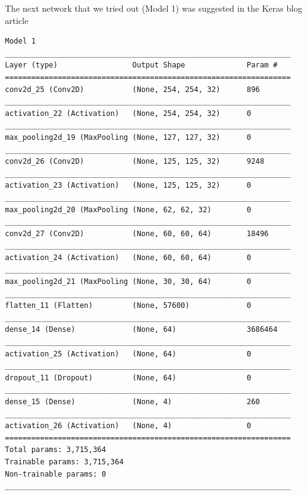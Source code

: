 \documentclass[10pt,a4paper]{article}
\begin{document}
\newpage
The next network that we tried out (Model 1) was suggested in the Keras blog article \cite{Chollet_2016}
\begin{lstlisting}
Model 1
_________________________________________________________________
Layer (type)                 Output Shape              Param #   
=================================================================
conv2d_25 (Conv2D)           (None, 254, 254, 32)      896       
_________________________________________________________________
activation_22 (Activation)   (None, 254, 254, 32)      0         
_________________________________________________________________
max_pooling2d_19 (MaxPooling (None, 127, 127, 32)      0         
_________________________________________________________________
conv2d_26 (Conv2D)           (None, 125, 125, 32)      9248      
_________________________________________________________________
activation_23 (Activation)   (None, 125, 125, 32)      0         
_________________________________________________________________
max_pooling2d_20 (MaxPooling (None, 62, 62, 32)        0         
_________________________________________________________________
conv2d_27 (Conv2D)           (None, 60, 60, 64)        18496     
_________________________________________________________________
activation_24 (Activation)   (None, 60, 60, 64)        0         
_________________________________________________________________
max_pooling2d_21 (MaxPooling (None, 30, 30, 64)        0         
_________________________________________________________________
flatten_11 (Flatten)         (None, 57600)             0         
_________________________________________________________________
dense_14 (Dense)             (None, 64)                3686464   
_________________________________________________________________
activation_25 (Activation)   (None, 64)                0         
_________________________________________________________________
dropout_11 (Dropout)         (None, 64)                0         
_________________________________________________________________
dense_15 (Dense)             (None, 4)                 260       
_________________________________________________________________
activation_26 (Activation)   (None, 4)                 0         
=================================================================
Total params: 3,715,364
Trainable params: 3,715,364
Non-trainable params: 0
_________________________________________________________________
\end{lstlisting}
\end{document}
